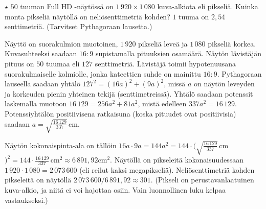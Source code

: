 \begin{tehtavasivu}
\begin{tehtava}
$\star$ $50$ tuuman Full HD -näytössä on $1\,920\times1\,080$ kuva-alkiota eli pikseliä. Kuinka monta pikseliä näytöllä on neliösenttimetriä kohden? $1$ tuuma on $2,54$ senttimetriä. (Tarvitset Pythagoraan lausetta.)
	\begin{vastaus}
Näyttö on suorakulmion muotoinen, $1\,920$ pikseliä leveä ja $1\,080$ pikseliä korkea. Kuvasuhteeksi saadaan $16:9$ supistamalla pituuksien osamäärä. Näytön lävistäjän pituus on $50$ tuumaa eli $127$ senttimetriä. Lävistäjä toimii hypotenuusana suorakulmaiselle kolmiolle, jonka kateettien suhde on mainittu $16:9$. Pythagoraan lauseella saadaan yhtälö $127^2=(16a)^2+(9a)^2$, missä $a$ on näytön leveyden ja korkeuden pienin yhteinen tekijä (senttimetreissä). Yhtälö saadaan potenssit laskemalla muotoon $16\,129=256a^2+81a^2$, mistä edelleen $337a^2=16\,129$. Potenssiyhtälön positiivisena ratkaisuna (koska pituudet ovat positiivisia) saadaan $a=\sqrt{\frac{16\,129}{337}}$\,cm.

Näytön kokonaispinta-ala on tällöin $16a\cdot 9a=144a^2=144\cdot (\sqrt{\frac{16\,129}{337}}$\,cm$)^2=144\cdot\frac{16\,129}{337}$\,cm$^2\approx 6\,891,92$cm$^2$. Näytöllä on pikseleitä kokonaisuudessaan $1\,920\cdot 1\,080=2\,073\,600$ (eli reilut kaksi megapikseliä). Neliösenttimetriä kohden pikseleitä on näytöllä $2\,073\,600/6\,891,92 \approx 301$. (Pikseli on perustavanlaatuinen kuva-alkio, ja niitä ei voi hajottaa osiin. Vain luonnollinen luku kelpaa vastaukseksi.)
	\end{vastaus}
\end{tehtava}

\end{tehtavasivu}